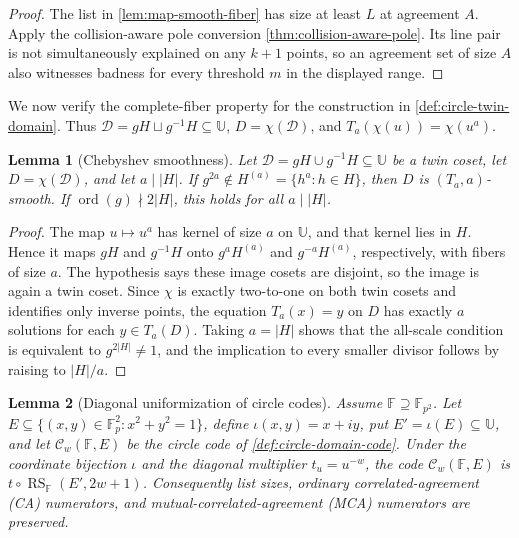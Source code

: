\documentclass[12pt,a4paper]{amsart}
\numberwithin{equation}{section}
\newtheorem{lemma}[lemma]{Lemma}
\theoremstyle{remark}
\DeclareMathOperator{\RS}{RS}
\DeclareMathOperator{\ord}{ord}
\newcommand{\F}{\mathbb F}
\newcommand{\Ccal}{\mathcal C}
\newcommand{\Dcal}{\mathcal D}
\newcommand{\UU}{\mathbb U}
\newcommand{\abs}[1]{\lvert #1\rvert}
\begin{document}
\begin{proof}
The list in \cref{lem:map-smooth-fiber} has size at least \(L\) at
agreement \(A\).  Apply the collision-aware pole conversion
\cref{thm:collision-aware-pole}.  Its line pair is not simultaneously
explained on any \(k+1\) points, so an agreement set of size \(A\) also
witnesses badness for every threshold \(m\) in the displayed range.
\end{proof}

We now verify the complete-fiber property for the construction in
\cref{def:circle-twin-domain}.  Thus
\(\Dcal=gH\sqcup g^{-1}H\subseteq\UU\),
\(D=\chi(\Dcal)\), and \(T_a(\chi(u))=\chi(u^a)\).

\begin{lemma}[Chebyshev smoothness]\label{lem:cheb-smooth}
Let \(\Dcal=gH\cup g^{-1}H\subseteq\UU\) be a twin coset, let \(D=\chi(\Dcal)\), and let \(a\mid\abs H\).  If \(g^{2a}\notin H^{(a)}=\{h^a:h\in H\}\), then \(D\) is \((T_a,a)\)-smooth.  If \(\ord(g)\nmid2\abs H\), this holds for all \(a\mid\abs H\).
\end{lemma}

\begin{proof}
The map \(u\mapsto u^a\) has kernel of size \(a\) on \(\UU\), and that kernel lies in \(H\).  Hence it maps \(gH\) and \(g^{-1}H\) onto \(g^aH^{(a)}\) and \(g^{-a}H^{(a)}\), respectively, with fibers of size \(a\).  The hypothesis says these image cosets are disjoint, so the image is again a twin coset.  Since \(\chi\) is exactly two-to-one on both twin cosets and identifies only inverse points, the equation \(T_a(x)=y\) on \(D\) has exactly \(a\) solutions for each \(y\in T_a(D)\).  Taking \(a=\abs H\) shows that the all-scale condition is equivalent to \(g^{2\abs H}\ne1\), and the implication to every smaller divisor follows by raising to \(\abs H/a\).
\end{proof}

\begin{lemma}[Diagonal uniformization of circle codes]\label{lem:circle-uniformization}
Assume \(\F\supseteq\F_{p^2}\).  Let
\(E\subseteq\{(x,y)\in\F_p^2:x^2+y^2=1\}\), define
\(\iota(x,y)=x+iy\), put \(E'=\iota(E)\subseteq\UU\), and let
\(\Ccal_w(\F,E)\) be the circle code of
\cref{def:circle-domain-code}.  Under the coordinate bijection \(\iota\)
and the diagonal multiplier \(t_u=u^{-w}\), the code
\(\Ccal_w(\F,E)\) is \(t\circ\RS_\F(E',2w+1)\).
Consequently list sizes, ordinary correlated-agreement (CA) numerators,
and mutual-correlated-agreement (MCA) numerators are preserved.
\end{lemma}
\end{document}
